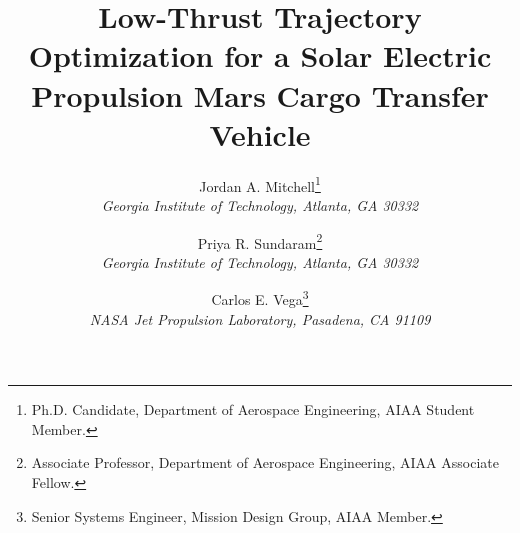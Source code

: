 \usepackage{amssymb}

\usepackage{amsmath,graphicx,pgfplots,booktabs,url}

\pgfplotsset{compat=1.18}

\title{Low-Thrust Trajectory Optimization for a Solar Electric Propulsion
       Mars Cargo Transfer Vehicle}

\author{
  Jordan A. Mitchell\thanks{Ph.D. Candidate, Department of Aerospace Engineering, AIAA Student Member.}\\
  {\normalsize\itshape Georgia Institute of Technology, Atlanta, GA 30332}
  \and
  Priya R. Sundaram\thanks{Associate Professor, Department of Aerospace Engineering, AIAA Associate Fellow.}\\
  {\normalsize\itshape Georgia Institute of Technology, Atlanta, GA 30332}
  \and
  Carlos E. Vega\thanks{Senior Systems Engineer, Mission Design Group, AIAA Member.}\\
  {\normalsize\itshape NASA Jet Propulsion Laboratory, Pasadena, CA 91109}
}
